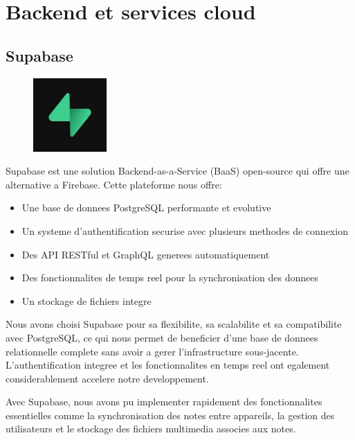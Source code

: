 \section{Backend et services cloud}

\subsection{Supabase}
\begin{figure}
    \centering
    \includegraphics[width=0.25\textwidth]{assets/docs/logo_supabase.png}
\end{figure}
Supabase est une solution Backend-as-a-Service (BaaS) open-source qui offre une alternative a Firebase. Cette plateforme nous offre:

\begin{itemize}
    \item Une base de donnees PostgreSQL performante et evolutive
    \item Un systeme d'authentification securise avec plusieurs methodes de connexion
    \item Des API RESTful et GraphQL generees automatiquement
    \item Des fonctionnalites de temps reel pour la synchronisation des donnees
    \item Un stockage de fichiers integre
\end{itemize}

Nous avons choisi Supabase pour sa flexibilite, sa scalabilite et sa compatibilite avec PostgreSQL, ce qui nous permet de beneficier d'une base de donnees relationnelle complete sans avoir a gerer l'infrastructure sous-jacente. L'authentification integree et les fonctionnalites en temps reel ont egalement considerablement accelere notre developpement.

Avec Supabase, nous avons pu implementer rapidement des fonctionnalites essentielles comme la synchronisation des notes entre appareils, la gestion des utilisateurs et le stockage des fichiers multimedia associes aux notes.

